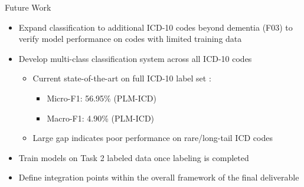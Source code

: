 \documentclass[
    10pt,
    aspectratio=169,
]{beamer}
\begin{document}
\begin{frame}{Future Work}
\begin{itemize}
    \item Expand classification to additional ICD-10 codes beyond dementia (F03) to verify model performance on codes with limited training data
    \item Develop multi-class classification system across all ICD-10 codes
    \begin{itemize}
        \item Current state-of-the-art on full ICD-10 label set \cite{nguyen2023mimic}:
        \begin{itemize}
            \item Micro-F1: 56.95\% (PLM-ICD)
            \item Macro-F1: 4.90\% (PLM-ICD)
        \end{itemize}
        \item Large gap indicates poor performance on rare/long-tail ICD codes
    \end{itemize}
    \item Train models on Task 2 labeled data once labeling is completed
    \item Define integration points within the overall framework of the final deliverable
\end{itemize}

\end{frame}
\end{document}
